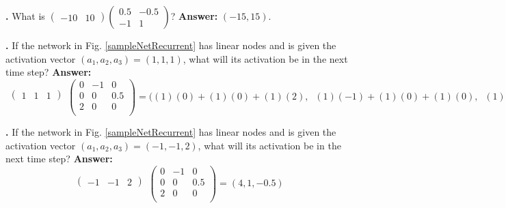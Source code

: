 \noindent
{}
{\bf \theLinearAlgebraCounter.}  What is
$\begin{pmatrix}-10 & 10\end{pmatrix}\begin{pmatrix} 0.5 & -0.5  \\ -1 &  1\end{pmatrix}$?
{\bf Answer:} $(-15,15)$. 
\bigskip


\noindent
{}\label{linAlgPractice1}
{\bf \theLinearAlgebraCounter.}  If the network in Fig. \ref{sampleNetRecurrent} has linear nodes and is given the activation vector $(a_1,a_2,a_3) = (1,1,1)$, what will its activation be in the next time step?
{\bf Answer:} 
\[
  \begin{matrix}\begin{pmatrix}1 & 1 & 1\end{pmatrix}\\\mbox{}\end{matrix}
 \begin{pmatrix}
 0  &   -1 & 0 \\
 0  &   0 & 0.5 \\
 2  &   0 & 0 \\
\end{pmatrix}
  =
  \bigg( (1)(0) + (1)(0) + (1)(2) ,\;\; (1)(-1) + (1)(0) + (1)(0) ,\;\; (1)(0) + (1)(.5) + (1)(0) \bigg)
  =  (2,-1,0.5)
\]
\bigskip

\noindent
{}
{\bf \theLinearAlgebraCounter.}  If the network in Fig. \ref{sampleNetRecurrent} has linear nodes and is given the activation vector $(a_1,a_2,a_3) = (-1,-1,2)$, what will its activation be in the next time step?
{\bf Answer:} 
\[
  \begin{matrix}\begin{pmatrix}-1 & -1 & 2\end{pmatrix}\\\mbox{}\end{matrix}
 \begin{pmatrix}
 0  &   -1 & 0 \\
 0  &   0 & 0.5 \\
 2  &   0 & 0 \\
\end{pmatrix}
  =  (4,1,-0.5)
\]
\bigskip


